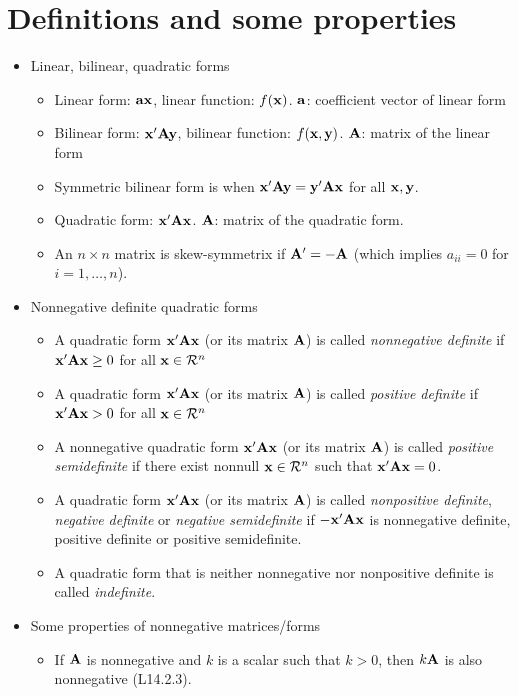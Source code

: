\documentclass[a4paper, oneside]{book}
\begin{document}
\section{Definitions and some properties}
\begin{itemize}
\item Linear, bilinear, quadratic forms
	\begin{itemize}
	\item Linear form:  $\mathbf{ax}$, linear function: $f(\mathbf{x})$. $\mathbf{a}$: coefficient vector of linear form
	\item Bilinear form:  $\mathbf{x'Ay}$, bilinear function: $f(\mathbf{x,y})$. $\mathbf{A}$: matrix of the linear form
	\item Symmetric bilinear form is when $\mathbf{x'Ay} = \mathbf{y'Ax}$ for all $\mathbf{x,y}$.  
	\item Quadratic form: $\mathbf{x'Ax}$. $\mathbf{A}$: matrix of the quadratic form.
	\item An $n\times n$ matrix is skew-symmetrix if $\mathbf{A}'=-\mathbf{A}$ (which implies $a_{ii}=0$ for $i=1,\hdots,n$).
	\end{itemize}
\item Nonnegative definite quadratic forms
	\begin{itemize}
	\item A quadratic form $\mathbf{x'Ax}$ (or its matrix $\mathbf{A}$) is called \textit{nonnegative definite} if $\mathbf{x'Ax}\ge 0$ for all $\mathbf{x} \in \mathcal{R}^n$
	\item A quadratic form $\mathbf{x'Ax}$ (or its matrix $\mathbf{A}$) is called \textit{positive definite} if $\mathbf{x'Ax}> 0$ for all $\mathbf{x} \in \mathcal{R}^n$
	\item A nonnegative quadratic form $\mathbf{x'Ax}$ (or its matrix $\mathbf{A}$) is called \textit{positive semidefinite} if there exist nonnull $\mathbf{x}\in \mathcal{R}^n$ such that $\mathbf{x'Ax}=0$.
	\item A quadratic form  $\mathbf{x'Ax}$ (or its matrix $\mathbf{A}$) is called \textit{nonpositive definite}, \textit{negative definite} or \textit{negative semidefinite} if $-\mathbf{x'Ax}$ is nonnegative definite, positive definite or positive semidefinite.
	\item A quadratic form that is neither nonnegative nor nonpositive definite is called \textit{indefinite}.
	\end{itemize}
\item Some properties of nonnegative matrices/forms
	\begin{itemize}
	\item If $\mathbf{A}$ is nonnegative and $k$ is a scalar such that $k>0$, then $k\mathbf{A}$ is also nonnegative (L14.2.3).

\end{itemize}
\end{itemize}
\end{document}
